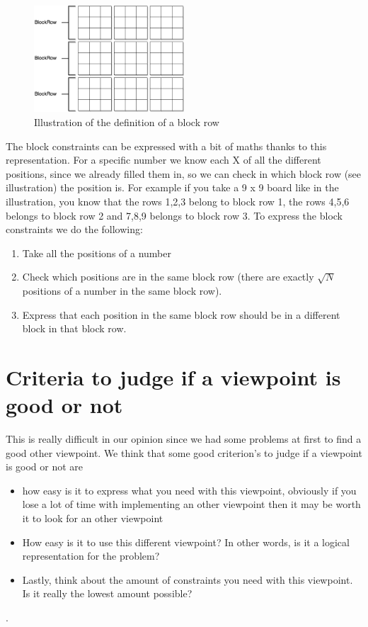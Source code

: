 \documentclass{report}
\begin{document}
\begin{figure}[h]
\centering
\includegraphics[width=0.5\textwidth]{blockRow}
\caption{Illustration of the definition of a block row}
\end{figure}

The block constraints can be expressed with a bit of maths thanks to this representation. For a specific number we know each X of all the different positions, since we already filled them in, so we can check in which block row (see illustration) the position is. For example if you take a 9 x 9 board like in the illustration, you know that the rows 1,2,3 belong to block row 1, the rows 4,5,6 belongs to block row 2 and 7,8,9 belongs to block row 3. To express the block constraints we do the following:
\begin{enumerate}
	\item Take all the positions of a number
	\item Check which positions are in the same block row (there are exactly $\sqrt{N}$ positions of a number in the same block row).
	\item Express that each position in the same block row should be in a different block in that block row.
\end{enumerate}

\section{Criteria to judge if a viewpoint is good or not}
This is really difficult in our opinion since we had some problems at first to find a good other viewpoint. We think that some good criterion's to judge if a viewpoint is good or not are
\begin{itemize}
    \item how easy is it to express what you need with this viewpoint, obviously if you lose a lot of time with implementing an other viewpoint then it may be worth it to look for an other viewpoint
    \item How easy is it to use this different viewpoint? In other words, is it a logical representation for the problem?
    \item Lastly, think about the amount of constraints you need with this viewpoint. Is it really the lowest amount possible?
\end{itemize}.
\end{document}
